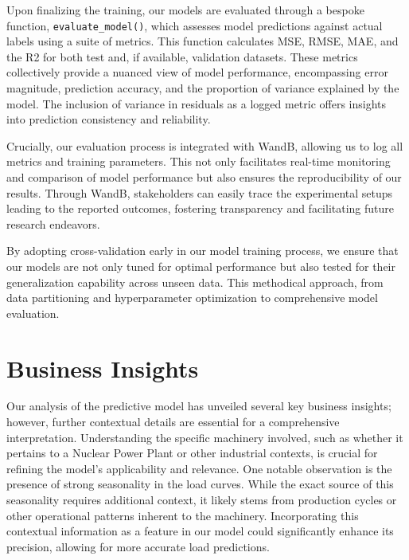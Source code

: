 \documentclass{article} %
\begin{document}
Upon finalizing the training, our models are evaluated through a bespoke function, \texttt{evaluate\_model()}, which assesses model predictions against actual labels using a suite of metrics. This function calculates \gls{MSE}, \gls{RMSE}, \gls{MAE}, and the \gls{R2} for both test and, if available, validation datasets. These metrics collectively provide a nuanced view of model performance, encompassing error magnitude, prediction accuracy, and the proportion of variance explained by the model. The inclusion of variance in residuals as a logged metric offers insights into prediction consistency and reliability. 

Crucially, our evaluation process is integrated with \gls{WandB}, allowing us to log all metrics and training parameters. This not only facilitates real-time monitoring and comparison of model performance but also ensures the reproducibility of our results. Through \gls{WandB}, stakeholders can easily trace the experimental setups leading to the reported outcomes, fostering transparency and facilitating future research endeavors. 

By adopting cross-validation early in our model training process, we ensure that our models are not only tuned for optimal performance but also tested for their generalization capability across unseen data. This methodical approach, from data partitioning and hyperparameter optimization to comprehensive model evaluation. 

\section{Business Insights}
Our analysis of the predictive model has unveiled several key business insights; however, further contextual details are essential for a comprehensive interpretation. Understanding the specific machinery involved, such as whether it pertains to a Nuclear Power Plant or other industrial contexts, is crucial for refining the model's applicability and relevance. One notable observation is the presence of strong seasonality in the load curves. While the exact source of this seasonality requires additional context, it likely stems from production cycles or other operational patterns inherent to the machinery. Incorporating this contextual information as a feature in our model could significantly enhance its precision, allowing for more accurate load predictions.
\end{document}

